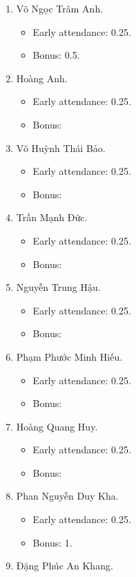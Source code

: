 \documentclass{article}
\begin{document}
\begin{enumerate}
	\item {\sc Võ Ngọc Trâm Anh.}
	\begin{itemize}
		\item Early attendance: 0.25.
		\item Bonus: 0.5.
	\end{itemize}
	\item {\sc Hoàng Anh.}
	\begin{itemize}
		\item Early attendance: 0.25.
		\item Bonus: 
	\end{itemize}
	\item {\sc Võ Huỳnh Thái Bảo.}
	\begin{itemize}
		\item Early attendance: 0.25.
		\item Bonus: 
	\end{itemize}
	\item {\sc Trần Mạnh Đức.}
	\begin{itemize}
		\item Early attendance: 0.25.
		\item Bonus: 
	\end{itemize}
	\item {\sc Nguyễn Trung Hậu.}
	\begin{itemize}
		\item Early attendance: 0.25.
		\item Bonus: 
	\end{itemize}
	\item {\sc Phạm Phước Minh Hiếu.}
	\begin{itemize}
		\item Early attendance: 0.25.
		\item Bonus: 
	\end{itemize}
	\item {\sc Hoàng Quang Huy.}
	\begin{itemize}
		\item Early attendance: 0.25.
		\item Bonus: 
	\end{itemize}
	\item {\sc Phan Nguyễn Duy Kha.}
	\begin{itemize}
		\item Early attendance: 0.25.
		\item Bonus: 1.
	\end{itemize}
	\item {\sc Đặng Phúc An Khang.}

\end{enumerate}
\end{document}
